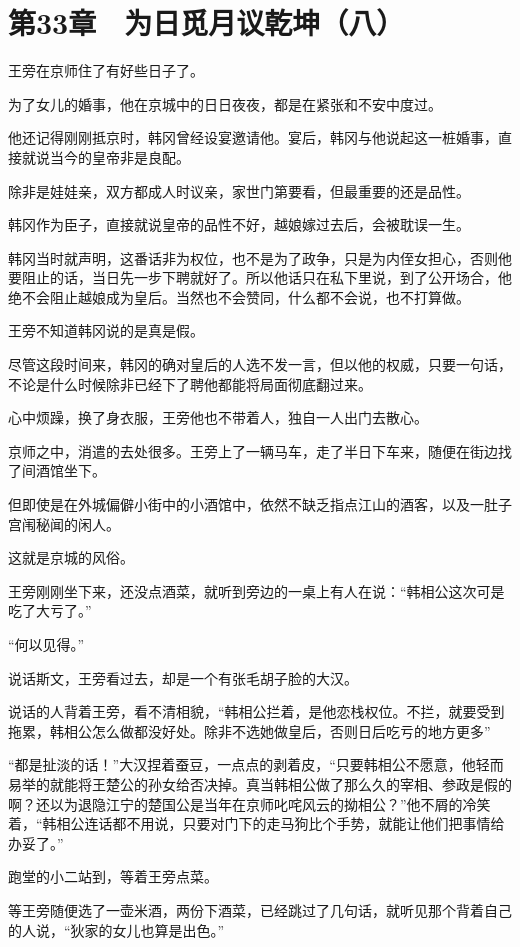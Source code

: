 \section{第33章　为日觅月议乾坤（八）}

王旁在京师住了有好些日子了。

为了女儿的婚事，他在京城中的日日夜夜，都是在紧张和不安中度过。

他还记得刚刚抵京时，韩冈曾经设宴邀请他。宴后，韩冈与他说起这一桩婚事，直接就说当今的皇帝非是良配。

除非是娃娃亲，双方都成人时议亲，家世门第要看，但最重要的还是品性。

韩冈作为臣子，直接就说皇帝的品性不好，越娘嫁过去后，会被耽误一生。

韩冈当时就声明，这番话非为权位，也不是为了政争，只是为内侄女担心，否则他要阻止的话，当日先一步下聘就好了。所以他话只在私下里说，到了公开场合，他绝不会阻止越娘成为皇后。当然也不会赞同，什么都不会说，也不打算做。

王旁不知道韩冈说的是真是假。

尽管这段时间来，韩冈的确对皇后的人选不发一言，但以他的权威，只要一句话，不论是什么时候除非已经下了聘他都能将局面彻底翻过来。

心中烦躁，换了身衣服，王旁他也不带着人，独自一人出门去散心。

京师之中，消遣的去处很多。王旁上了一辆马车，走了半日下车来，随便在街边找了间酒馆坐下。

但即使是在外城偏僻小街中的小酒馆中，依然不缺乏指点江山的酒客，以及一肚子宫闱秘闻的闲人。

这就是京城的风俗。

王旁刚刚坐下来，还没点酒菜，就听到旁边的一桌上有人在说：“韩相公这次可是吃了大亏了。”

“何以见得。”

说话斯文，王旁看过去，却是一个有张毛胡子脸的大汉。

说话的人背着王旁，看不清相貌，“韩相公拦着，是他恋栈权位。不拦，就要受到拖累，韩相公怎么做都没好处。除非不选她做皇后，否则日后吃亏的地方更多”

“都是扯淡的话！”大汉捏着蚕豆，一点点的剥着皮，“只要韩相公不愿意，他轻而易举的就能将王楚公的孙女给否决掉。真当韩相公做了那么久的宰相、参政是假的啊？还以为退隐江宁的楚国公是当年在京师叱咤风云的拗相公？”他不屑的冷笑着，“韩相公连话都不用说，只要对门下的走马狗比个手势，就能让他们把事情给办妥了。”

跑堂的小二站到，等着王旁点菜。

等王旁随便选了一壶米酒，两份下酒菜，已经跳过了几句话，就听见那个背着自己的人说，“狄家的女儿也算是出色。”

